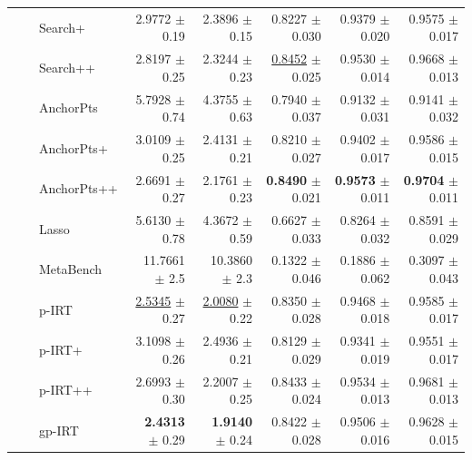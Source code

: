 \begin{longtable}{llp{}rrrrr}
 &  & Search+ & 2.9772 {\scriptsize $\pm$ 0.19} & 2.3896 {\scriptsize $\pm$ 0.15} & 0.8227 {\scriptsize $\pm$ 0.030} & 0.9379 {\scriptsize $\pm$ 0.020} & 0.9575 {\scriptsize $\pm$ 0.017} \\
 &  & Search++ & 2.8197 {\scriptsize $\pm$ 0.25} & 2.3244 {\scriptsize $\pm$ 0.23} & \underline{0.8452} {\scriptsize $\pm$ 0.025} & 0.9530 {\scriptsize $\pm$ 0.014} & 0.9668 {\scriptsize $\pm$ 0.013} \\
 &  & AnchorPts & 5.7928 {\scriptsize $\pm$ 0.74} & 4.3755 {\scriptsize $\pm$ 0.63} & 0.7940 {\scriptsize $\pm$ 0.037} & 0.9132 {\scriptsize $\pm$ 0.031} & 0.9141 {\scriptsize $\pm$ 0.032} \\
 &  & AnchorPts+ & 3.0109 {\scriptsize $\pm$ 0.25} & 2.4131 {\scriptsize $\pm$ 0.21} & 0.8210 {\scriptsize $\pm$ 0.027} & 0.9402 {\scriptsize $\pm$ 0.017} & 0.9586 {\scriptsize $\pm$ 0.015} \\
 &  & AnchorPts++ & 2.6691 {\scriptsize $\pm$ 0.27} & 2.1761 {\scriptsize $\pm$ 0.23} & \textbf{0.8490} {\scriptsize $\pm$ 0.021} & \textbf{0.9573} {\scriptsize $\pm$ 0.011} & \textbf{0.9704} {\scriptsize $\pm$ 0.011} \\
 &  & Lasso & 5.6130 {\scriptsize $\pm$ 0.78} & 4.3672 {\scriptsize $\pm$ 0.59} & 0.6627 {\scriptsize $\pm$ 0.033} & 0.8264 {\scriptsize $\pm$ 0.032} & 0.8591 {\scriptsize $\pm$ 0.029} \\
 &  & MetaBench & 11.7661 {\scriptsize $\pm$ 2.5} & 10.3860 {\scriptsize $\pm$ 2.3} & 0.1322 {\scriptsize $\pm$ 0.046} & 0.1886 {\scriptsize $\pm$ 0.062} & 0.3097 {\scriptsize $\pm$ 0.043} \\
 &  & p-IRT & \underline{2.5345} {\scriptsize $\pm$ 0.27} & \underline{2.0080} {\scriptsize $\pm$ 0.22} & 0.8350 {\scriptsize $\pm$ 0.028} & 0.9468 {\scriptsize $\pm$ 0.018} & 0.9585 {\scriptsize $\pm$ 0.017} \\
 &  & p-IRT+ & 3.1098 {\scriptsize $\pm$ 0.26} & 2.4936 {\scriptsize $\pm$ 0.21} & 0.8129 {\scriptsize $\pm$ 0.029} & 0.9341 {\scriptsize $\pm$ 0.019} & 0.9551 {\scriptsize $\pm$ 0.017} \\
 &  & p-IRT++ & 2.6993 {\scriptsize $\pm$ 0.30} & 2.2007 {\scriptsize $\pm$ 0.25} & 0.8433 {\scriptsize $\pm$ 0.024} & 0.9534 {\scriptsize $\pm$ 0.013} & 0.9681 {\scriptsize $\pm$ 0.013} \\
 &  & gp-IRT & \textbf{2.4313} {\scriptsize $\pm$ 0.29} & \textbf{1.9140} {\scriptsize $\pm$ 0.24} & 0.8422 {\scriptsize $\pm$ 0.028} & 0.9506 {\scriptsize $\pm$ 0.016} & 0.9628 {\scriptsize $\pm$ 0.015} \\

\end{longtable}
